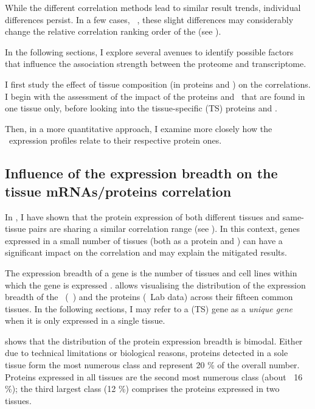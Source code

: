 While the different correlation methods lead to similar result trends,
individual differences persist.
In a few cases, \eg\ \heart,
these slight differences may considerably change
the relative correlation ranking order of the \treps{} (see ).\mybr\

In the following sections,
I explore several avenues to identify possible factors
that influence the association strength
between the proteome and transcriptome.\mybr\

I first study the effect of tissue composition (in proteins and \mRNAs)
on the correlations.
I begin with the assessment of the impact of the proteins and \mRNAs\
that are found in one tissue only,
before looking into the tissue-specific (\gls{TS}) proteins and \mRNAs{}.\mybr\

Then, in a more quantitative approach,
I examine more closely how the \mRNA\ expression profiles relate
to their respective protein ones.\mybr\

\subsection{Influence of the expression breadth on the tissue %
\texorpdfstring{\MakeLowercase{m}RNAs/proteins}{mRNAs/proteins} correlation}

In ,
I have shown that
the protein expression of both different tissues and same-tissue pairs
are sharing a similar correlation range
(see ).
In this context,
genes expressed in a small number of tissues
(both as a protein and \mRNA)
can have a significant impact on the correlation
and may explain the mitigated results.\mybr\

The expression breadth of a gene is
the number of tissues and cell lines within which the gene is expressed
.
\Cref{fig:expressionBreadth} allows visualising
the distribution of the expression breadth of the \mRNAs\ (\uhlen\ \etal)
and the proteins (\pandey\ Lab data) across their fifteen common tissues.
In the following sections,
I may refer to a (\gls{TS}) gene as a \emph{unique gene}
when it is only expressed in a single tissue.\mybr\

 shows that
the distribution of the protein expression breadth is bimodal.
Either due to technical limitations or biological reasons,
proteins detected in a sole tissue form
the most numerous class and represent 20 \% of the overall number.
Proteins expressed in all tissues are the second most numerous class (about $~$ 16 \%);
the third largest class (12 \%) comprises the proteins expressed in two tissues.\mybr\

